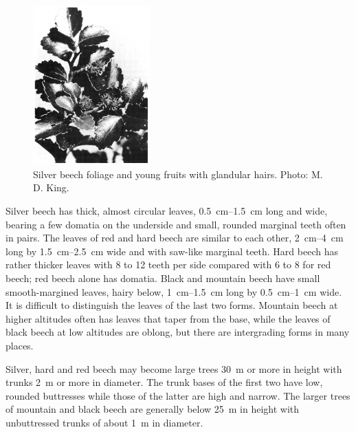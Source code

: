 \begin{figure}
	\includegraphics[width=0.4\textwidth]{graphics/figure69silverbeech.jpg}
	\centering
	\caption[Silver beech foliage and young fruits]{Silver beech foliage and young fruits with glandular hairs.
	Photo: M. D. King.}%
	\label{fig:69silverbeech}
\end{figure}

Silver beech has thick, almost circular leaves, \SIrange{0.5}{1.5}{\centi\metre} long and wide, bearing a few domatia on the underside and small, rounded marginal teeth often in pairs.
The leaves of red and hard beech are similar to each other, \SIrange{2}{4}{\centi\metre} long by \SIrange{1.5}{2.5}{\centi\metre} wide and with saw-like marginal teeth.
Hard beech has rather thicker leaves with 8 to 12 teeth per side compared with 6 to 8 for red beech; red beech alone has domatia.
Black and mountain beech have small smooth-margined leaves, hairy below, \SIrange{1}{1.5}{\centi\metre} long by \SIrange{0.5}{1}{\centi\metre} wide.
It is difficult to distinguish the leaves of the last two forms.
Mountain beech at higher altitudes often has leaves that taper from the base, while the leaves of black beech at low altitudes are oblong, but there are intergrading forms in many places.

Silver, hard and red beech may become large trees \SI{30}{\metre} or more in height with trunks \SI{2}{\metre} or more in diameter.
The trunk bases of the first two have low, rounded buttresses while those of the latter are high and narrow.
The larger trees of mountain and black beech are generally below \SI{25}{\metre} in height with unbuttressed trunks of about \SI{1}{\metre} in diameter.

